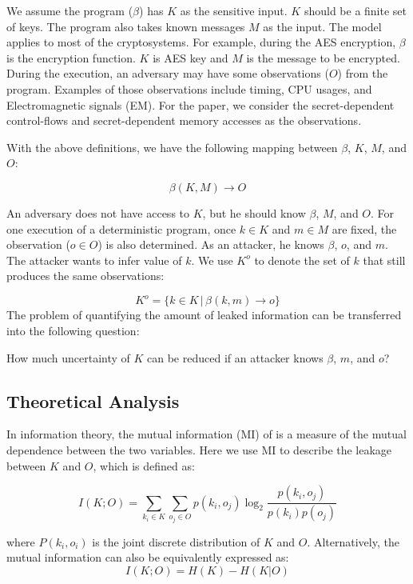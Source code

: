 We assume the program ($\beta$) has $K$ as the sensitive input. 
$K$ should be a finite set of keys. The program also takes known messages $M$ as the input. 
The model applies to most of the cryptosystems. For example,
during the AES encryption, $\beta$ is the encryption function. $K$ is AES key and
$M$ is the message to be encrypted. During the execution, an adversary may have some observations ($O$) from the program. Examples of those observations
include timing, CPU usages, and Electromagnetic signals (EM). For the paper, we
consider the secret-dependent control-flows and secret-dependent memory accesses
as the observations.

With the above definitions, we have the following mapping between $\beta$, $K$, $M$, and $O$:

\begin{displaymath}
    \beta(K, M) \rightarrow	O
\end{displaymath}

An adversary does not have access to $K$, but he should know $\beta$, $M$, and $O$. 
For one execution of a deterministic program, once $k \in K$ and $m \in M$ are fixed, the 
observation ($o \in O$) is also determined. As an attacker, he knows $\beta$, $o$, 
and $m$. The attacker wants to infer value of $k$. We use $K^o$ to denote the set of
$k$ that still produces the same observations:

\begin{displaymath}
    K^o = \{ k \in K \, |\, \beta(k, m) \rightarrow o\}
\end{displaymath}
The problem of quantifying the amount of leaked information can be transferred into the
following question: 

How much uncertainty of $K$ can be reduced if an attacker knows $\beta$, $m$, and $o$?  
 
\subsection{Theoretical Analysis}
In information theory, the mutual information (MI) of is a measure of the mutual dependence 
between the two variables. Here we use MI to describe the leakage between $K$ and $O$, 
which is defined as:

\begin{equation} \label{eq:1}
    I(K;O) = \sum_{k_i {\in} K}{\sum_{o_j {\in} O}{p(k_i, o_j)\log_2\frac{p(k_i, o_j)}{p(k_i)p(o_j)}}}
\end{equation}

where $P(k_i, o_i)$ is the joint discrete distribution of $K$ and $O$.
Alternatively, the mutual information can also be equivalently expressed as:
\begin{equation} \label{eq:2}
    I(K;O) = H(K) - H(K|O)
\end{equation}

